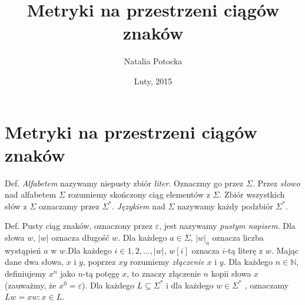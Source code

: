 \documentclass[]{article}
\title{Metryki na przestrzeni ciągów znaków}
\author{Natalia Potocka}
\date{Luty, 2015}
\begin{document}
\maketitle


\section{Metryki na przestrzeni ciągów
znaków}\label{metryki-na-przestrzeni-ciagow-znakow}

Def. \emph{Alfabetem} nazywamy niepusty zbiór \emph{liter}. Oznaczmy go
przez $\Sigma$. Przez \emph{słowo} nad alfabetem $\Sigma$ rozumiemy
skończony ciąg elementów z $\Sigma$. Zbiór wszystkich słów z $\Sigma$
oznaczamy przez $\Sigma^*$. \emph{Językiem} nad $\Sigma$ nazywamy każdy
podzbiór $\Sigma^*$.

Def. Pusty ciąg znaków, oznaczony przez $\varepsilon$, jest nazywamy
\emph{pustym napisem}. Dla słowa $w$, $|w|$ oznacza długość $w$. Dla
każdego $a \in \Sigma$, $|w|_a$ oznacza liczba wystąpień $a$ w $w$.Dla
każdego $i \in {1,2, \ldots, |w|}$, $w[i]$ oznacza $i$-tą literę z $w$.
Mając dane dwa słowa, $x$ i $y$, poprzez $xy$ rozumiemy \emph{złączenie}
$x$ i $y$. Dla każdego $n \in \mathbb{N}$, definiujemy $x^n$ jako $n$-tą
potęgę $x$, to znaczy złączenie $n$ kopii słowa $x$ (zauważmy, że
$x^0=\varepsilon$). Dla każdego $L \subseteq \Sigma^*$ i dla każdego
$w \in \Sigma^*$ , oznaczamy $Lw = {xw: x \in L}$.
\end{document}
